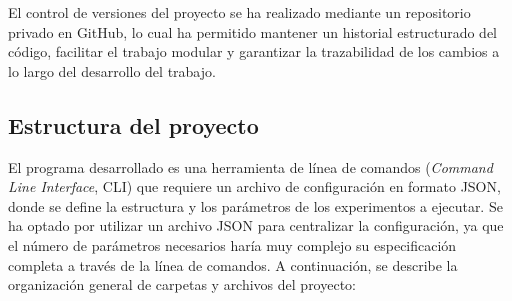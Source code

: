 \documentclass[../main.tex]{subfiles}
\begin{document}
El control de versiones del proyecto se ha realizado mediante un repositorio privado en GitHub, lo cual ha permitido mantener un historial estructurado del código, facilitar el trabajo modular y garantizar la trazabilidad de los cambios a lo largo del desarrollo del trabajo.


\subsection{Estructura del proyecto}
El programa desarrollado es una herramienta de línea de comandos (\textit{Command Line Interface}, CLI) que requiere un archivo de configuración en formato JSON, donde se define la estructura y los parámetros de los experimentos a ejecutar. Se ha optado por utilizar un archivo JSON para centralizar la configuración, ya que el número de parámetros necesarios haría muy complejo su especificación completa a través de la línea de comandos. A continuación, se describe la organización general de carpetas y archivos del proyecto:
\end{document}
